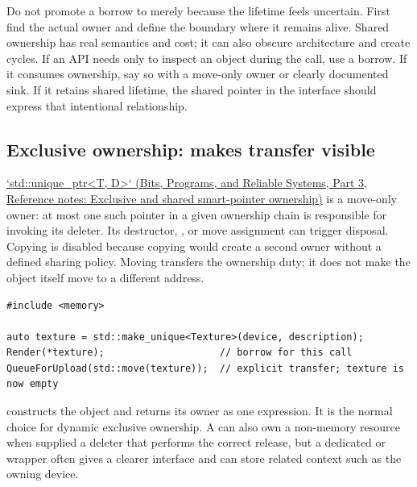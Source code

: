 Do not promote a borrow to  merely because the lifetime feels uncertain. First find the actual owner and define the boundary where it remains alive. Shared ownership has real semantics and cost; it can also obscure architecture and create cycles. If an API needs only to inspect an object during the call, use a borrow. If it consumes ownership, say so with a move-only owner or clearly documented sink. If it retains shared lifetime, the shared pointer in the interface should express that intentional relationship.

\subsection{\texorpdfstring{Exclusive ownership:  makes transfer visible}{Exclusive ownership:  makes transfer visible}}\label{05-engine-i-ch004-exclusive-ownership-unique_ptr-makes-transfer-visible}

\hypertarget{05-engine-i-ch004-exclusive-ownership-unique_ptr-makes-transfer-visible}{}

\href{../01-Bits-Programs-and-Reliable-Systems-P03/main.pdf\#nameddest=appendix-51602cabe815}{`std::unique\_ptr\textless T, D\textgreater` (Bits, Programs, and Reliable Systems, Part 3, Reference notes: Exclusive and shared smart-pointer ownership)} is a move-only owner: at most one such pointer in a given ownership chain is responsible for invoking its deleter. Its destructor, , or move assignment can trigger disposal. Copying is disabled because copying would create a second owner without a defined sharing policy. Moving transfers the ownership duty; it does not make the object itself move to a different address.

\begin{verbatim}
#include <memory>

auto texture = std::make_unique<Texture>(device, description);
Render(*texture);                    // borrow for this call
QueueForUpload(std::move(texture));  // explicit transfer; texture is now empty
\end{verbatim}

 constructs the object and returns its owner as one expression. It is the normal choice for dynamic exclusive ownership. A  can also own a non-memory resource when supplied a deleter that performs the correct release, but a dedicated  or  wrapper often gives a clearer interface and can store related context such as the owning device.

